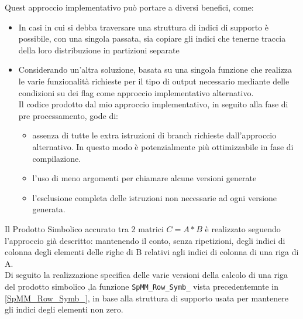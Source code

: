 Quest approccio implementativo può portare a diversi benefici, come:
\begin{itemize}
	\item In casi in cui si debba traversare una struttura di indici di supporto
		  è possibile,  con una singola passata, 
		  sia copiare gli indici che tenerne traccia della loro distribuzione in partizioni separate 

	\item Considerando un'altra soluzione, basata su una singola funzione che realizza le varie  %
		  funzionalità richieste per il tipo di output necessario mediante delle condizioni su dei flag come approccio implementativo alternativo.\\
		  Il codice prodotto dal mio approccio implementativo, in seguito alla fase di pre processamento, gode di:
	\begin{itemize}
		\item assenza di tutte le extra istruzioni di branch richieste dall'approccio alternativo. 
			  In questo modo è potenzialmente più ottimizzabile in fase di compilazione.
		\item l'uso di meno argomenti per chiamare alcune versioni generate 
		\item l'esclusione completa delle istruzioni non necessarie ad ogni versione generata.
	\end{itemize}
\end{itemize}
Il Prodotto Simbolico accurato tra 2 matrici $C=A*B$ è realizzato seguendo l'approccio \rowbyrow già descritto: 
mantenendo il conto, senza ripetizioni, degli indici di colonna degli elementi \nnz delle righe di B relativi agli indici di colonna di una riga di A.\\
\label{chSpMMSymb:SpMM_Row_Symb_targetBaseFunc}
Di seguito la realizzazione specifica delle varie versioni della calcolo di una riga del prodotto simbolico
,la funzione \verb|SpMM_Row_Symb_| vista precedentemnte in \ref{SpMM_Row_Symb_},
in base alla struttura di supporto usata per mantenere gli indici degli elementi non zero. 

